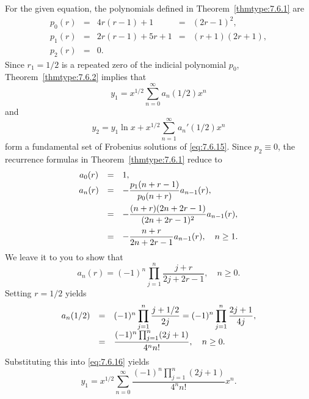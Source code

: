 \begin{examplesolution}
\solution For the given equation, the polynomials defined in Theorem~\ref{thmtype:7.6.1} are
\[
  \begin{array}{ccccc}
    p_{0}(r) & = & 4r(r-1)+1    & = & (2r-1)^{2},  \\[5pt]
    p_{1}(r) & = & 2r(r-1)+5r+1 & = & (r+1)(2r+1), \\[5pt]
    p_{2}(r) & = & 0.
  \end{array}
\]
Since $r_{1}=1/2$ is a repeated zero of the indicial polynomial $p_{0}$, Theorem~\ref{thmtype:7.6.2}
implies that
\begin{equation}
  \label{eq:7.6.16}y_{1}=x^{1/2}\sum_{n=0}^{\infty}a_{n}(1/2)x^{n}
\end{equation}
and
\begin{equation}
  \label{eq:7.6.17}y_{2}=y_{1}\ln x+x^{1/2}\sum_{n=1}^{\infty}a_{n}'(1/2)x^{n}
\end{equation}
form a fundamental set of Frobenius solutions of \eqref{eq:7.6.15}. Since $p_{2}\equiv0$, the
recurrence formulas in Theorem~\ref{thmtype:7.6.1} reduce to
\[
  \begin{array}{ccl}
    a_{0}(r) & = & 1,                                                   \\
    a_{n}(r) & = & -\displaystyle\frac{p_{1}(n+r-1)}{p_{0}(n+r)}a_{n-1}(r),      \\[10pt]
             & = & -\displaystyle\frac{(n+r)(2n+2r-1)}{(2n+2r-1)^{2}}a_{n-1}(r), \\[10pt]
             & = & -\displaystyle\frac{n+r}{2n+2r-1}a_{n-1}(r),\quad n\ge1.
  \end{array}
\]
We leave it to you to show that
\begin{equation}
  \label{eq:7.6.18}a_{n}(r)=(-1)^{n}\prod_{j=1}^{n}\frac{j+r}{2j+2r-1},\quad n\ge0.
\end{equation}
Setting $r=1/2$ yields
\begin{equation}
  \label{eq:7.6.19}
  \begin{array}{ccl}
    a_{n}(1/2) & = & (-1)^{n}\displaystyle\prod_{j=1}^{n}\displaystyle\frac{j+1/2}{2j}= (-1)^{n}\prod_{j=1}^{n}\displaystyle\frac{2j+1}{4j}, \\[10pt]
               & = & \displaystyle\frac{(-1)^{n}\prod_{j=1}^{n}(2j+1)}{4^{n}n!},\quad n\ge0.
  \end{array}
\end{equation}
Substituting this into \eqref{eq:7.6.16} yields
\[
  y_{1}=x^{1/2}\sum_{n=0}^{\infty}\frac{(-1)^{n}\prod_{j=1}^{n}(2j+1)}{4^{n}n!}x^{n}.
\]


\end{examplesolution}
